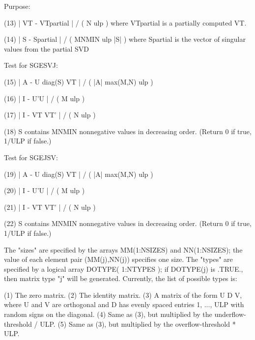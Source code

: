 \begin{DoxyParagraph}{Purpose\+: }
\begin{DoxyVerb}
 (13)   | VT - VTpartial | / ( N ulp ) where VTpartial is a partially
        computed VT.

 (14)   | S - Spartial | / ( MNMIN ulp |S| ) where Spartial is the
        vector of singular values from the partial SVD

 Test for SGESVJ:

 (15)    | A - U diag(S) VT | / ( |A| max(M,N) ulp )

 (16)    | I - U'U | / ( M ulp )

 (17)   | I - VT VT' | / ( N ulp )

 (18)   S contains MNMIN nonnegative values in decreasing order.
        (Return 0 if true, 1/ULP if false.)

 Test for SGEJSV:

 (19)    | A - U diag(S) VT | / ( |A| max(M,N) ulp )

 (20)    | I - U'U | / ( M ulp )

 (21)   | I - VT VT' | / ( N ulp )

 (22)   S contains MNMIN nonnegative values in decreasing order.
        (Return 0 if true, 1/ULP if false.)

 The "sizes" are specified by the arrays MM(1:NSIZES) and
 NN(1:NSIZES); the value of each element pair (MM(j),NN(j))
 specifies one size.  The "types" are specified by a logical array
 DOTYPE( 1:NTYPES ); if DOTYPE(j) is .TRUE., then matrix type "j"
 will be generated.
 Currently, the list of possible types is:

 (1)  The zero matrix.
 (2)  The identity matrix.
 (3)  A matrix of the form  U D V, where U and V are orthogonal and
      D has evenly spaced entries 1, ..., ULP with random signs
      on the diagonal.
 (4)  Same as (3), but multiplied by the underflow-threshold / ULP.
 (5)  Same as (3), but multiplied by the overflow-threshold * ULP.\end{DoxyVerb}
 
\end{DoxyParagraph}

